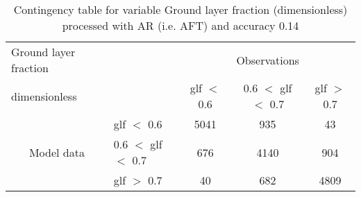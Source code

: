 \begin{table}[]
\begin{center}
\begin{tabular}{llccc}
\hline
{Ground layer fraction}                                       &                                                    & \multicolumn{3}{c}{Observations}                 \\
{dimensionless}                                       &                             & glf $<$ 0.6   & 0.6 $<$ glf $<$ 0.7 & glf $>$ 0.7 \\
\hline
\multicolumn{1}{c}{\multirow{3}{*}{Model data}}  & glf $<$ 0.6             & 5041                & 935                       & 43              \\
                                                 & 0.6  $<$ glf $<$ 0.7 & 676                & 4140                       & 904              \\
                                                 & glf $>$ 0.7             & 40                & 682                       & 4809              \\
\hline
\end{tabular}
\end{center}
\caption{Contingency table for variable Ground layer fraction (dimensionless) processed with AR (i.e. AFT) and accuracy 0.14}
\label{tab:contingencyglfAFT}
\end{table}
